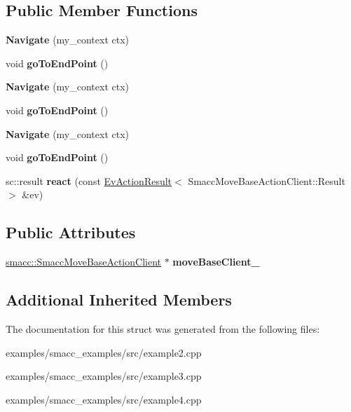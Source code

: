 \subsection*{Public Member Functions}
\begin{DoxyCompactItemize}
\item 
\mbox{\label{structNavigate_a6be585a62dc40f453857b649017b4e82}} 
{\bfseries Navigate} (my\+\_\+context ctx)
\item 
\mbox{\label{structNavigate_a941523c9ba8391d3775d6b7f62fe1261}} 
void {\bfseries go\+To\+End\+Point} ()
\item 
\mbox{\label{structNavigate_a6be585a62dc40f453857b649017b4e82}} 
{\bfseries Navigate} (my\+\_\+context ctx)
\item 
\mbox{\label{structNavigate_a941523c9ba8391d3775d6b7f62fe1261}} 
void {\bfseries go\+To\+End\+Point} ()
\item 
\mbox{\label{structNavigate_a6be585a62dc40f453857b649017b4e82}} 
{\bfseries Navigate} (my\+\_\+context ctx)
\item 
\mbox{\label{structNavigate_a941523c9ba8391d3775d6b7f62fe1261}} 
void {\bfseries go\+To\+End\+Point} ()
\item 
\mbox{\label{structNavigate_ac058d0da392b7c5e1873702820595ae4}} 
sc\+::result {\bfseries react} (const \hyperlink{structsmacc_1_1EvActionResult}{Ev\+Action\+Result}$<$ Smacc\+Move\+Base\+Action\+Client\+::\+Result $>$ \&ev)
\end{DoxyCompactItemize}
\subsection*{Public Attributes}
\begin{DoxyCompactItemize}
\item 
\mbox{\label{structNavigate_a6ccf129ef69c3a8f664ecb8c367dae86}} 
\hyperlink{classsmacc_1_1SmaccMoveBaseActionClient}{smacc\+::\+Smacc\+Move\+Base\+Action\+Client} $\ast$ {\bfseries move\+Base\+Client\+\_\+}
\end{DoxyCompactItemize}
\subsection*{Additional Inherited Members}


The documentation for this struct was generated from the following files\+:\begin{DoxyCompactItemize}
\item 
examples/smacc\+\_\+examples/src/example2.\+cpp\item 
examples/smacc\+\_\+examples/src/example3.\+cpp\item 
examples/smacc\+\_\+examples/src/example4.\+cpp\end{DoxyCompactItemize}
